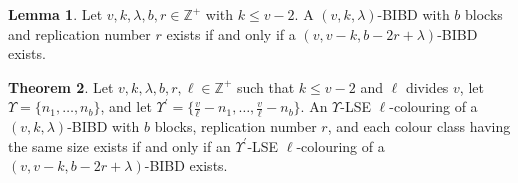 \documentclass[12pt]{article}
\theoremstyle{definition}
\newtheorem{theorem}{Theorem}[section]
\newtheorem{lemma}[theorem]{Lemma}
\newcommand{\deviations}{\Upsilon}
\begin{document}
\begin{lemma}\label{lem: complement of a BIBD}
    Let $v,k,\lambda, b, r \in \mathbb{Z}^+$ with $k\leq v-2$. A $(v,k,\lambda)$-BIBD with $b$ blocks and replication number $r$ exists if and only if a $(v, v-k, b-2r+\lambda)$-BIBD exists.
\end{lemma}

\begin{theorem}\label{thm: complements of SE colourings}
    Let $v,k,\lambda, b, r, \ell \in \mathbb{Z}^+$ such that $k\leq v-2$ and $\ell$ divides $v$, let $\deviations = \{n_1, \dots, n_b\}$, and let $\deviations^\prime = \{\frac{v}{\ell} - n_1, \dots, \frac{v}{\ell}- n_b\}$. An $\deviations$-LSE $\ell$-colouring of a $(v,k,\lambda)$-BIBD with $b$ blocks, replication number $r$, and each colour class having the same size exists if and only if an $\deviations^\prime$-LSE $\ell$-colouring of a $(v, v-k, b-2r+\lambda)$-BIBD exists.
\end{theorem}
\end{document}
